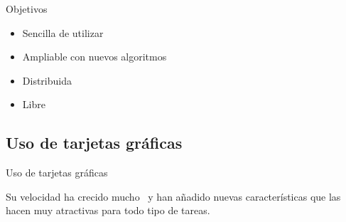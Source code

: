 \documentclass[12pt]{beamer}
\begin{document}
\begin{frame}{Objetivos}
	\begin{itemize}
		\item Sencilla de utilizar
		\item Ampliable con nuevos algoritmos
		\item Distribuida
		\item Libre
	\end{itemize}
\end{frame}

\subsection{Uso de tarjetas gráficas}
\begin{frame}{Uso de tarjetas gráficas}
	\begin{center}
		Su velocidad ha crecido mucho~\cite{nvidia:cuda_c_programming_guide} y han añadido nuevas características que las hacen muy atractivas para todo tipo de tareas.
	\end{center}
\end{frame}
\end{document}
